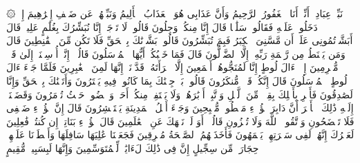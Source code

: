 \startbuffer[\q:15:49]
۞ نَبِّئۡ عِبَادِیۤ أَنِّیۤ أَنَا ٱلۡغَفُورُ ٱلرَّحِیمُ%
\stopbuffer%
\startbuffer[\q:15:50]
وَأَنَّ عَذَابِی هُوَ ٱلۡعَذَابُ ٱلۡأَلِیمُ%
\stopbuffer%
\startbuffer[\q:15:51]
وَنَبِّئۡهُمۡ عَن ضَیۡفِ إِبۡرَٰهِیمَ%
\stopbuffer%
\startbuffer[\q:15:52]
إِذۡ دَخَلُوا۟ عَلَیۡهِ فَقَالُوا۟ سَلَٰمࣰا قَالَ إِنَّا مِنكُمۡ وَجِلُونَ%
\stopbuffer%
\startbuffer[\q:15:53]
قَالُوا۟ لَا تَوۡجَلۡ إِنَّا نُبَشِّرُكَ بِغُلَٰمٍ عَلِیمࣲ%
\stopbuffer%
\startbuffer[\q:15:54]
قَالَ أَبَشَّرۡتُمُونِی عَلَىٰۤ أَن مَّسَّنِیَ ٱلۡكِبَرُ فَبِمَ تُبَشِّرُونَ%
\stopbuffer%
\startbuffer[\q:15:55]
قَالُوا۟ بَشَّرۡنَٰكَ بِٱلۡحَقِّ فَلَا تَكُن مِّنَ ٱلۡقَٰنِطِینَ%
\stopbuffer%
\startbuffer[\q:15:56]
قَالَ وَمَن یَقۡنَطُ مِن رَّحۡمَةِ رَبِّهِۦۤ إِلَّا ٱلضَّاۤلُّونَ%
\stopbuffer%
\startbuffer[\q:15:57]
قَالَ فَمَا خَطۡبُكُمۡ أَیُّهَا ٱلۡمُرۡسَلُونَ%
\stopbuffer%
\startbuffer[\q:15:58]
قَالُوۤا۟ إِنَّاۤ أُرۡسِلۡنَاۤ إِلَىٰ قَوۡمࣲ مُّجۡرِمِینَ%
\stopbuffer%
\startbuffer[\q:15:59]
إِلَّاۤ ءَالَ لُوطٍ إِنَّا لَمُنَجُّوهُمۡ أَجۡمَعِینَ%
\stopbuffer%
\startbuffer[\q:15:60]
إِلَّا ٱمۡرَأَتَهُۥ قَدَّرۡنَاۤ إِنَّهَا لَمِنَ ٱلۡغَٰبِرِینَ%
\stopbuffer%
\startbuffer[\q:15:61]
فَلَمَّا جَاۤءَ ءَالَ لُوطٍ ٱلۡمُرۡسَلُونَ%
\stopbuffer%
\startbuffer[\q:15:62]
قَالَ إِنَّكُمۡ قَوۡمࣱ مُّنكَرُونَ%
\stopbuffer%
\startbuffer[\q:15:63]
قَالُوا۟ بَلۡ جِئۡنَٰكَ بِمَا كَانُوا۟ فِیهِ یَمۡتَرُونَ%
\stopbuffer%
\startbuffer[\q:15:64]
وَأَتَیۡنَٰكَ بِٱلۡحَقِّ وَإِنَّا لَصَٰدِقُونَ%
\stopbuffer%
\startbuffer[\q:15:65]
فَأَسۡرِ بِأَهۡلِكَ بِقِطۡعࣲ مِّنَ ٱلَّیۡلِ وَٱتَّبِعۡ أَدۡبَٰرَهُمۡ وَلَا یَلۡتَفِتۡ مِنكُمۡ أَحَدࣱ وَٱمۡضُوا۟ حَیۡثُ تُؤۡمَرُونَ%
\stopbuffer%
\startbuffer[\q:15:66]
وَقَضَیۡنَاۤ إِلَیۡهِ ذَٰلِكَ ٱلۡأَمۡرَ أَنَّ دَابِرَ هَٰۤؤُلَاۤءِ مَقۡطُوعࣱ مُّصۡبِحِینَ%
\stopbuffer%
\startbuffer[\q:15:67]
وَجَاۤءَ أَهۡلُ ٱلۡمَدِینَةِ یَسۡتَبۡشِرُونَ%
\stopbuffer%
\startbuffer[\q:15:68]
قَالَ إِنَّ هَٰۤؤُلَاۤءِ ضَیۡفِی فَلَا تَفۡضَحُونِ%
\stopbuffer%
\startbuffer[\q:15:69]
وَٱتَّقُوا۟ ٱللَّهَ وَلَا تُخۡزُونِ%
\stopbuffer%
\startbuffer[\q:15:70]
قَالُوۤا۟ أَوَ لَمۡ نَنۡهَكَ عَنِ ٱلۡعَٰلَمِینَ%
\stopbuffer%
\startbuffer[\q:15:71]
قَالَ هَٰۤؤُلَاۤءِ بَنَاتِیۤ إِن كُنتُمۡ فَٰعِلِینَ%
\stopbuffer%
\startbuffer[\q:15:72]
لَعَمۡرُكَ إِنَّهُمۡ لَفِی سَكۡرَتِهِمۡ یَعۡمَهُونَ%
\stopbuffer%
\startbuffer[\q:15:73]
فَأَخَذَتۡهُمُ ٱلصَّیۡحَةُ مُشۡرِقِینَ%
\stopbuffer%
\startbuffer[\q:15:74]
فَجَعَلۡنَا عَٰلِیَهَا سَافِلَهَا وَأَمۡطَرۡنَا عَلَیۡهِمۡ حِجَارَةࣰ مِّن سِجِّیلٍ%
\stopbuffer%
\startbuffer[\q:15:75]
إِنَّ فِی ذَٰلِكَ لَءَایَٰتࣲ لِّلۡمُتَوَسِّمِینَ%
\stopbuffer%
\startbuffer[\q:15:76]
وَإِنَّهَا لَبِسَبِیلࣲ مُّقِیمٍ%
